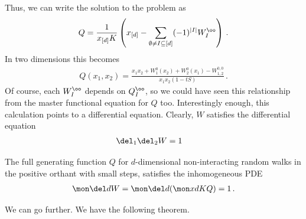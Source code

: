 Thus, we can write the solution to the problem as
\begin{align}
	Q = \frac{1}{x_{[d]}K}\left(x_{[d]}-\sum_{\emptyset \neq I\subseteq [d]}(-1)^{|I|} W_I^\oo\right)\,.
\end{align}
In two dimensions this becomes
\begin{align}
	Q(x_1,x_2) = \frac{x_1x_2+W_1^0(x_2)+W_2^0(x_1)-W_{1,2}^{0,0}}{x_1x_2(1-tS)}\,.
\end{align}
Of course, each $W_I^\oo$ depends on $Q_I^\oo$, so we could have seen this relationship from the master functional equation for $Q$ too.
Interestingly enough, this calculation points to a differential equation. Clearly, $W$ satisfies the differential equation
\begin{align}
	\del_1\del_2 W &= 1
\end{align}
\begin{prop} The full generating function $Q$ for $d$-dimensional non-interacting random walks in the positive orthant with small steps, satisfies the inhomogeneous PDE
\begin{align}
	\mon \del d W = \mon \del d (\mon xd KQ) = 1\,.
\end{align}
\end{prop}
We can go further. We have the following theorem.

